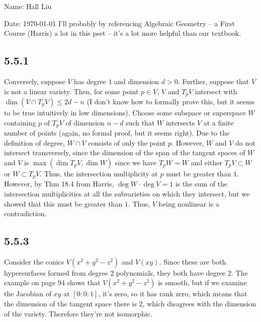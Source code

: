 \documentclass{article}
\begin{document}
Name: Hall Liu

Date: \today 
\vspace{1.5cm}
I'll probably by referencing Algebraic Geometry -- a First Course (Harris) a lot in this pset -- it's a lot more helpful than our textbook.
\subsection*{5.5.1}

Conversely, suppose $V$ has degree $1$ and dimension $d>0$. Further, suppose that $V$ is not a linear variety. Then, for some point $p\in V$, $V$ and $T_pV$ intersect with $\dim(V\cap T_pV)\leq 2d-n$ (I don't know how to formally prove this, but it seems to be true intuitively in low dimensions). Choose some subspace or superspace $W$ containing $p$ of $T_pV$ of dimension $n-d$ such that $W$ intersects $V$ at a finite number of points (again, no formal proof, but it seems right). Due to the definition of degree, $W\cap V$ consists of only the point $p$. However, $W$ and $V$ do not intersect transversely, since the dimension of the span of the tangent spaces of $W$ and $V$ is $\max(\dim T_pV, \dim W)$ since we have $T_pW=W$ and either $T_pV\subset W$ or $W\subset T_pV$. Thus, the intersection multiplicity at $p$ must be greater than $1$. However, by Thm 18.4 from Harris, $\deg W\cdot\deg V=1$ is the sum of the intersection multiplicities at all the subvarieties on which they intersect, but we showed that this must be greater than $1$. Thus, $V$ being nonlinear is a contradiction.
\subsection*{5.5.3}
Consider the conics $V(x^2+y^2-z^2)$ and $V(xy)$. Since these are both hypersurfaces formed from degree $2$ polynomials, they both have degree $2$. The example on page 94 shows that $V(x^2+y^2-z^2)$ is smooth, but if we examine the Jacobian of $xy$ at $[0:0:1]$, it's zero, so it has rank zero, which means that the dimension of the tangent space there is $2$, which disagrees with the dimension of the variety. Therefore they're not isomorphic.
\end{document}
